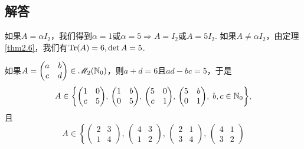 \subsection{解答}
\begin{solution}
  \begin{inparaenum}[(a)]
    \item 如果$A=\alpha I_2$，我们得到$\alpha=1$或$\alpha=5\Rightarrow A=I_2$或$A=5I_2$. 如果$A\ne\alpha I_2$，由定理 \ref{thm2.6}，我们有$\operatorname{Tr}(A)=6,\det A=5$.

        如果$A=\begin{pmatrix}
          a & b \\
          c & d
        \end{pmatrix}\in\mathscr M_2(\mathbb N_0)$，则$a+d=6$且$ad-bc=5$，于是
        \[
          A \in \left\{
            \begin{pmatrix}
              1 & 0 \\
              c & 5
            \end{pmatrix},\,
            \begin{pmatrix}
              1 & b \\
              0 & 5
            \end{pmatrix},\,
            \begin{pmatrix}
              5 & 0 \\
              c & 1
            \end{pmatrix},\,
            \begin{pmatrix}
              5 & b \\
              0 & 1
            \end{pmatrix},\;b,c\in\MN_0
          \right\},
        \]
        且
        \[
          A \in \left\{
            \begin{pmatrix}
              2 & 3 \\
              1 & 4
            \end{pmatrix},\,
            \begin{pmatrix}
              4 & 3 \\
              1 & 2
            \end{pmatrix},\,
            \begin{pmatrix}
              2 & 1 \\
              3 & 4
            \end{pmatrix},\,
            \begin{pmatrix}
              4 & 1 \\
              3 & 2

\end{pmatrix}\]
\end{inparaenum}
\end{solution}
